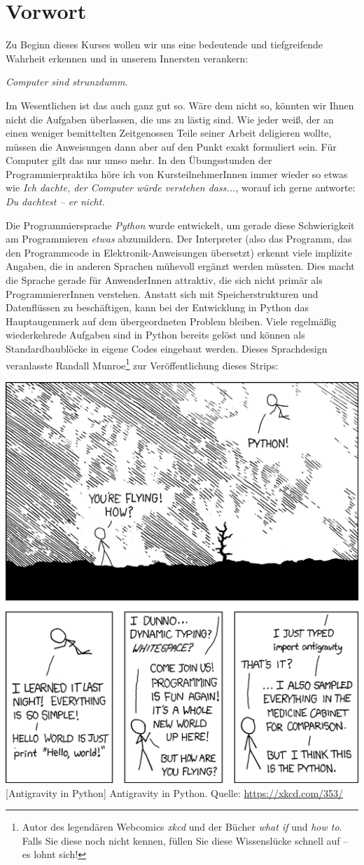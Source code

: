 \chapter*{Vorwort}
Zu Beginn dieses Kurses wollen wir uns eine bedeutende und tiefgreifende Wahrheit erkennen und in unserem Innersten verankern:

\begin{center}
\begin{Huge}
	\emph{Computer sind strunzdumm.}
\end{Huge}
\end{center}

Im Wesentlichen ist das auch ganz gut so. Wäre dem nicht so, könnten wir Ihnen nicht die Aufgaben überlassen, die uns zu lästig sind. Wie jeder weiß, der an einen weniger bemittelten Zeitgenossen Teile seiner Arbeit deligieren wollte, müssen die Anweisungen dann aber auf den Punkt exakt formuliert sein. Für Computer gilt das nur umso mehr. In den Übungsstunden der Programmierpraktika höre ich von KursteilnehmerInnen immer wieder so etwas wie \emph{Ich dachte, der Computer würde verstehen dass...}, worauf ich gerne antworte: \emph{Du dachtest -- er nicht.}

Die Programmiersprache \emph{Python} wurde entwickelt, um gerade diese Schwierigkeit am Programmieren \emph{etwas} abzumildern. Der Interpreter (also das Programm, das den Programmcode in Elektronik-Anweisungen übersetzt) erkennt viele implizite Angaben, die in anderen Sprachen mühevoll ergänzt werden müssten. Dies macht die Sprache gerade für AnwenderInnen attraktiv, die sich nicht primär als Programmierer\-Innen verstehen. Anstatt sich mit Speicherstrukturen und Datenflüssen zu beschäftigen, kann bei der Entwicklung in Python das Hauptaugenmerk auf dem übergeordneten Problem bleiben. Viele regelmäßig wiederkehrede Aufgaben sind in Python bereits gelöst und können als Standardbaublöcke in eigene Codes eingebaut werden. Dieses Sprachdesign veranlasste Randall Munroe\footnote{Autor des legendären Webcomics \emph{xkcd} und der Bücher \emph{what if} und \emph{how to}. Falls Sie diese noch nicht kennen, füllen Sie diese Wissenslücke schnell auf -- es lohnt sich!} zur Veröffentlichung dieses Strips:

\begin{center}
\includegraphics[width=.4\linewidth]{./gfx/xkcd-python}
	[Antigravity in Python]
	{Antigravity in Python. Quelle: \url{https://xkcd.com/353/}}
\end{center}


